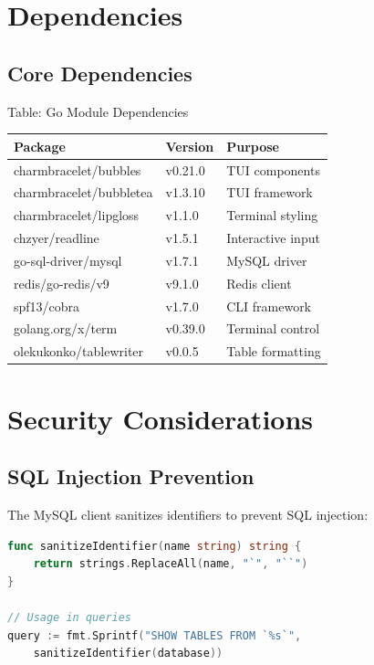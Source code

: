 \documentclass[11pt,a4paper]{report}
\begin{document}
\chapter{Dependencies}

\section{Core Dependencies}

Table: Go Module Dependencies

\begin{tabular}{lll}
\toprule
Package & Version & Purpose \\
\midrule
charmbracelet/bubbles & v0.21.0 & TUI components \\
charmbracelet/bubbletea & v1.3.10 & TUI framework \\
charmbracelet/lipgloss & v1.1.0 & Terminal styling \\
chzyer/readline & v1.5.1 & Interactive input \\
go-sql-driver/mysql & v1.7.1 & MySQL driver \\
redis/go-redis/v9 & v9.1.0 & Redis client \\
spf13/cobra & v1.7.0 & CLI framework \\
golang.org/x/term & v0.39.0 & Terminal control \\
olekukonko/tablewriter & v0.0.5 & Table formatting \\
\bottomrule
\end{tabular}

\chapter{Security Considerations}

\section{SQL Injection Prevention}

The MySQL client sanitizes identifiers to prevent SQL injection:

\begin{lstlisting}[language=Go]
func sanitizeIdentifier(name string) string {
    return strings.ReplaceAll(name, "`", "``")
}

// Usage in queries
query := fmt.Sprintf("SHOW TABLES FROM `%s`",
    sanitizeIdentifier(database))
\end{lstlisting}
\end{document}
